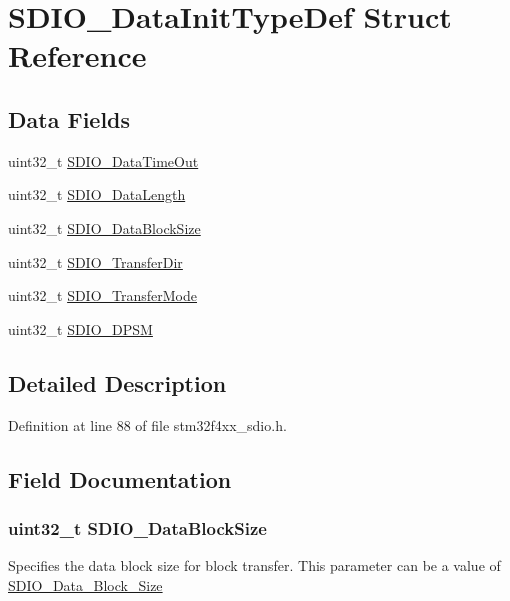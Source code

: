 \hypertarget{struct_s_d_i_o___data_init_type_def}{\section{S\-D\-I\-O\-\_\-\-Data\-Init\-Type\-Def Struct Reference}
\label{struct_s_d_i_o___data_init_type_def}
}
\subsection*{Data Fields}
\begin{DoxyCompactItemize}
\item 
uint32\-\_\-t \hyperlink{struct_s_d_i_o___data_init_type_def_aa02f4539b152bbc3d94bb65a563d302c}{S\-D\-I\-O\-\_\-\-Data\-Time\-Out}
\item 
uint32\-\_\-t \hyperlink{struct_s_d_i_o___data_init_type_def_a027631b174bafc0a746bf62446487fc9}{S\-D\-I\-O\-\_\-\-Data\-Length}
\item 
uint32\-\_\-t \hyperlink{struct_s_d_i_o___data_init_type_def_aa8a9c16ad0145fb75373940f0dc93805}{S\-D\-I\-O\-\_\-\-Data\-Block\-Size}
\item 
uint32\-\_\-t \hyperlink{struct_s_d_i_o___data_init_type_def_a8e3f15e7eab553fd3be0419ad809c3de}{S\-D\-I\-O\-\_\-\-Transfer\-Dir}
\item 
uint32\-\_\-t \hyperlink{struct_s_d_i_o___data_init_type_def_ab5a77921227a04c3aeb383b794c2a64c}{S\-D\-I\-O\-\_\-\-Transfer\-Mode}
\item 
uint32\-\_\-t \hyperlink{struct_s_d_i_o___data_init_type_def_a3f78865ad5cf3c8d1747faeeb3280d7e}{S\-D\-I\-O\-\_\-\-D\-P\-S\-M}
\end{DoxyCompactItemize}


\subsection{Detailed Description}


Definition at line 88 of file stm32f4xx\-\_\-sdio.\-h.



\subsection{Field Documentation}
\hypertarget{struct_s_d_i_o___data_init_type_def_aa8a9c16ad0145fb75373940f0dc93805}{
\subsubsection[{S\-D\-I\-O\-\_\-\-Data\-Block\-Size}]{\setlength{\rightskip}{0pt plus 5cm}uint32\-\_\-t S\-D\-I\-O\-\_\-\-Data\-Block\-Size}}\label{struct_s_d_i_o___data_init_type_def_aa8a9c16ad0145fb75373940f0dc93805}
Specifies the data block size for block transfer. This parameter can be a value of \hyperlink{group___s_d_i_o___data___block___size}{S\-D\-I\-O\-\_\-\-Data\-\_\-\-Block\-\_\-\-Size} 

